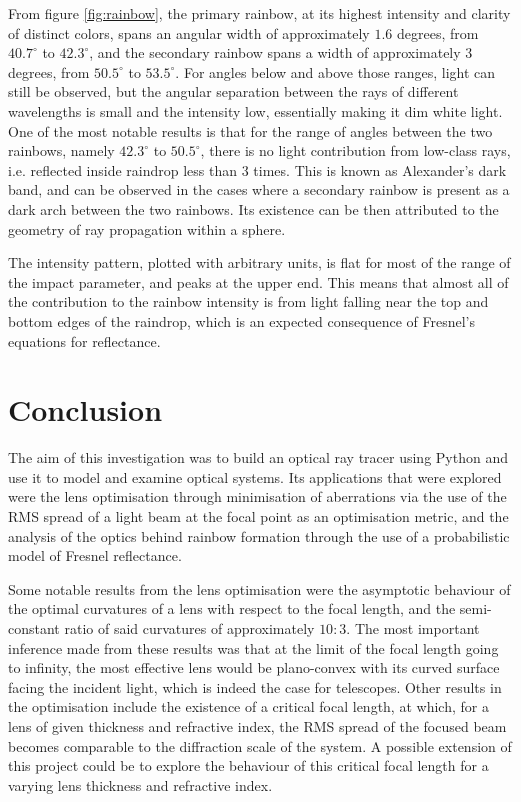 \documentclass{article}
\begin{document}
From figure \ref{fig:rainbow}, the primary rainbow, at its highest intensity and clarity of distinct colors, spans an angular width of approximately $1.6$ degrees, from $40.7^{\circ}$ to $42.3^{\circ}$, and the secondary rainbow spans a width of approximately $3$ degrees, from $50.5^{\circ}$ to $53.5^{\circ}$. For angles below and above those ranges, light can still be observed, but the angular separation between the rays of different wavelengths is small and the intensity low, essentially making it dim white light. One of the most notable results is that for the range of angles between the two rainbows, namely $42.3^{\circ}$ to $50.5^{\circ}$, there is no light contribution from low-class rays, i.e. reflected inside raindrop less than 3 times. This is known as Alexander's dark band, and can be observed in the cases where a secondary rainbow is present as a dark arch between the two rainbows. Its existence can be then attributed to the geometry of ray propagation within a sphere.

The intensity pattern, plotted with arbitrary units, is flat for most of the range of the impact parameter, and peaks at the upper end. This means that almost all of the contribution to the rainbow intensity is from light falling near the top and bottom edges of the raindrop, which is an expected consequence of Fresnel's equations for reflectance.

\pagebreak
\section{Conclusion}
The aim of this investigation was to build an optical ray tracer using Python and use it to model and examine optical systems. Its applications that were explored were the lens optimisation through minimisation of aberrations via the use of the RMS spread of a light beam at the focal point as an optimisation metric, and the analysis of the optics behind rainbow formation through the use of a probabilistic model of Fresnel reflectance.

Some notable results from the lens optimisation were the asymptotic behaviour of the optimal curvatures of a lens with respect to the focal length, and the semi-constant ratio of said curvatures of approximately $10:3$. The most important inference made from these results was that at the limit of the focal length going to infinity, the most effective lens would be plano-convex with its curved surface facing the incident light, which is indeed the case for telescopes. Other results in the optimisation include the existence of a critical focal length, at which, for a lens of given thickness and refractive index, the RMS spread of the focused beam becomes comparable to the diffraction scale of the system. A possible extension of this project could be to explore the behaviour of this critical focal length for a varying lens thickness and refractive index.
\end{document}
